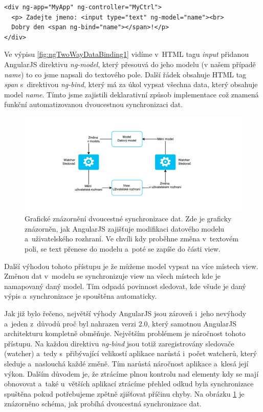 \begin{lstlisting}[numbers=none, caption=Zdrojový kód ukázky obrázku \ref{fig:ngTwoWayDataBinding}, label=lst:ngTwoWayDataBindingSourceCode]
<div ng-app="MyApp" ng-controller="MyCtrl">
  <p> Zadejte jmeno: <input type="text" ng-model="name"><br>
  Dobry den <span ng-bind="name"></span>!</p>
</div>
\end{lstlisting}

\vspace{5mm}

Ve výpisu \ref{fig:ngTwoWayDataBinding1} vidíme v~HTML tagu \textit {input} přidanou AngularJS direktivu \textit{ng-model}, který přesouvá do jeho modelu (v našem případě \textit{name})  to co jsme napsali do textového pole. Další řádek obsahuje HTML tag \textit{span} s~direktivou \textit{ng-bind}, který má za úkol vypsat všechna data, který obsahuje model \textit{name}. Tímto jsme zajistili deklarativní způsob implementace což znamená funkční automatizovanou dvoucestnou synchronizaci dat. 

\begin{figure}[H]
	\centering
	\includegraphics[width=20cm]{../TwoWayDataBinding.pdf}
	\caption{Grafické znázornění dvoucestné synchronizace dat. Zde je graficky znázorněn, jak AngularJS zajišťuje modifikaci datového modelu a~uživatelského rozhraní. Ve chvíli kdy proběhne změna v~textovém poli, se text přenese do modelu a~poté se zapíše do části view. }
	\label{fig:ngTwoWayDataBinding}
\end{figure}

Další výhodou tohoto přístupu je že můžeme model vypsat na více místech view. Změnou dat v~modelu se synchronizuje view na všech místech kde je namapovaný daný model. Tím odpadá povinnost sledovat, kde všude je daný výpis a~synchronizace je spouštěna automaticky.

Jak již bylo řečeno, největší výhody AngularJS jsou zároveň i~jeho nevýhody a~jeden z~důvodů proč byl nahrazen verzi 2.0, který samotnou AngularJS architekturu kompletně obměňuje. Největším problémem je náročnost tohoto přístupu. Na každou direktivu \textit{ng-bind} jsou totiž zaregistrovány sledovače (watcher) a~tedy s~přibývající velikostí aplikace narůstá i~počet watcherů, který sleduje a~naslouchá každé změně. Tím narůstá náročnost aplikace a~klesá její výkon. Dalším důvodem je, že ztrácíme plnou kontrolu nad elementy kdy se mají obnovovat a~také u~větších aplikací ztrácíme přehled odkud byla synchronizace spuštěna pokud potřebujeme zpětně zjišťovat příčinu chyby. Na obrázku \ref{fig:ngTwoWayDataBinding} je znázorněno schéma, jak probíhá dvoucestná synchronizace dat. \\



